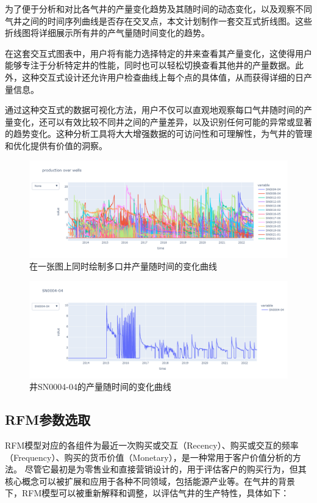 为了便于分析和对比各气井的产量变化趋势及其随时间的动态变化，以及观察不同气井之间的时间序列曲线是否存在交叉点，本文计划制作一套交互式折线图。这些折线图将详细展示所有井的产气量随时间变化的趋势。

在这套交互式图表中，用户将有能力选择特定的井来查看其产量变化，这使得用户能够专注于分析特定井的性能，同时也可以轻松切换查看其他井的产量数据。此外，这种交互式设计还允许用户检查曲线上每个点的具体值，从而获得详细的日产量信息。

通过这种交互式的数据可视化方法，用户不仅可以直观地观察每口气井随时间的产量变化，还可以有效比较不同井之间的产量差异，以及识别任何可能的异常或显著的趋势变化。这种分析工具将大大增强数据的可访问性和可理解性，为气井的管理和优化提供有价值的洞察。

\begin{figure}[H]
    \centering
    \includegraphics[scale=0.3,angle=0]{figure/productiongraph.png}
    \caption{在一张图上同时绘制多口井产量随时间的变化曲线}
    \label{fig:productionchange}
\end{figure}
\begin{figure}[H]
    \centering
    \includegraphics[scale=0.3,angle=0]{figure/awellgraph.png}
    \caption{井SN0004-04的产量随时间的变化曲线}
\end{figure}
\subsection{RFM参数选取}
RFM模型对应的各组件为最近一次购买或交互（Recency）、购买或交互的频率（Frequency）、购买的货币价值（Monetary），是一种常用于客户价值分析的方法。
尽管它最初是为零售业和直接营销设计的，用于评估客户的购买行为，但其核心概念可以被扩展和应用于各种不同领域，包括能源产业等。在气井的背景
下，RFM模型可以被重新解释和调整，以评估气井的生产特性，具体如下：

